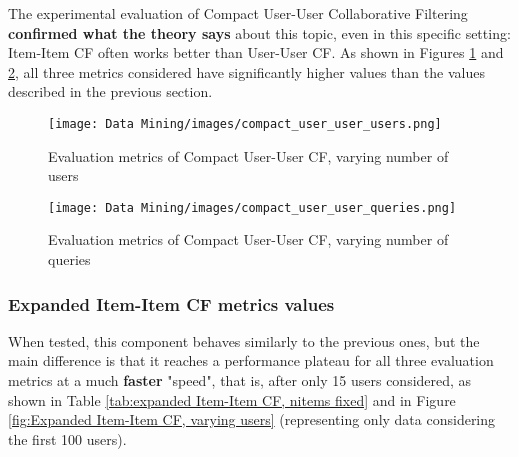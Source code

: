 The experimental evaluation of Compact User-User Collaborative Filtering \textbf{confirmed what the theory says} about this topic, even in this specific setting: Item-Item CF often works better than User-User CF. As shown in Figures \ref{fig:Compact User-User CF, varying users} and \ref{fig:Compact User-User CF, varying queries}, all three metrics considered have significantly higher values than the values described in the previous section.

\begin{figure}[h!]
\centering
\texttt{[image: Data Mining/images/compact\_user\_user\_users.png]}
\caption{Evaluation metrics of Compact User-User CF, varying number of users}
\label{fig:Compact User-User CF, varying users}
\end{figure}

\begin{figure}[h!]
\centering
\texttt{[image: Data Mining/images/compact\_user\_user\_queries.png]}
\caption{Evaluation metrics of Compact User-User CF, varying number of queries}
\label{fig:Compact User-User CF, varying queries}
\end{figure}


\subsubsection{Expanded Item-Item CF metrics values}

When tested, this component behaves similarly to the previous ones, but the main difference is that it reaches a performance plateau for all three evaluation metrics at a much \textbf{faster} "speed", that is, after only 15 users considered, as shown in Table \ref{tab:expanded Item-Item CF, nitems fixed} and in Figure \ref{fig:Expanded Item-Item CF, varying users} (representing only data considering the first 100 users).


